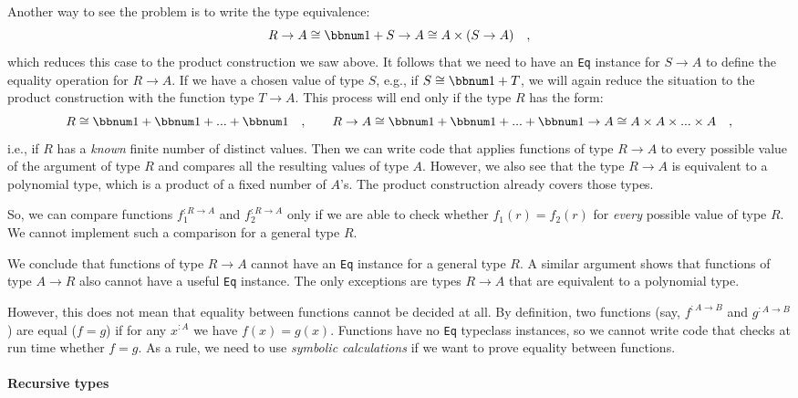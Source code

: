 Another way to see the problem is to write the type equivalence:
\[
R\rightarrow A\cong\bbnum 1+S\rightarrow A\cong A\times(S\rightarrow A)\quad,
\]
which reduces this case to the product construction we saw above.
It follows that we need to have an \lstinline!Eq! instance for $S\rightarrow A$
to define the equality operation for $R\rightarrow A$. If we have
a chosen value of type $S$, e.g., if $S\cong\bbnum 1+T$, we will
again reduce the situation to the product construction with the function
type $T\rightarrow A$. This process will end only if the type $R$
has the form:
\[
R\cong\bbnum 1+\bbnum 1+...+\bbnum 1\quad,\quad\quad R\rightarrow A\cong\bbnum 1+\bbnum 1+...+\bbnum 1\rightarrow A\cong A\times A\times...\times A\quad,
\]
i.e., if $R$ has a \emph{known} finite number of distinct values.
Then we can write code that applies functions of type $R\rightarrow A$
to every possible value of the argument of type $R$ and compares
all the resulting values of type $A$. However, we also see that the
type $R\rightarrow A$ is equivalent to a polynomial type, which is
a product of a fixed number of $A$\textsf{'}s. The product construction already
covers those types.

So, we can compare functions $f_{1}^{:R\rightarrow A}$ and $f_{2}^{:R\rightarrow A}$
only if we are able to check whether $f_{1}(r)=f_{2}(r)$ for \emph{every}
possible value of type $R$. We cannot implement such a comparison
for a general type $R$.

We conclude that functions of type $R\rightarrow A$ cannot have an
\lstinline!Eq! instance for a general type $R$. A similar argument
shows that functions of type $A\rightarrow R$ also cannot have a
useful \lstinline!Eq! instance. The only exceptions are types $R\rightarrow A$
that are equivalent to a polynomial type.

However, this does not mean that equality between functions cannot
be decided at all. By definition,
two functions (say, $f^{:A\rightarrow B}$ and $g^{:A\rightarrow B}$)
are equal ($f=g$) if for any $x^{:A}$ we have $f(x)=g(x)$. Functions
have no \lstinline!Eq! typeclass instances, so we cannot write code
that checks at run time whether $f=g$. As a rule, we need to use
\emph{symbolic
calculations} if we want to prove equality between functions. 

\paragraph{Recursive types}

